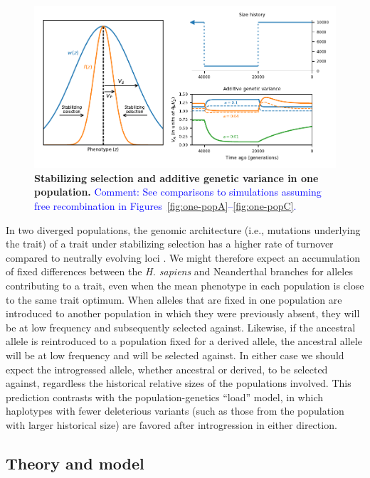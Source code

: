 \documentclass{article}
\newcommand{\aprcomment}[1]{{\textcolor{blue}{Comment: #1}}}
\begin{document}
\begin{figure}[tb!]
    \centering
    \includegraphics{../figures/one_pop.pdf}
    \caption{
        \textbf{Stabilizing selection and additive genetic variance in one population.}
        \aprcomment{See comparisons to simulations assuming free recombination in
        Figures~\ref{fig:one-popA}--\ref{fig:one-popC}.}
    }
    \label{fig:one-pop}
\end{figure}

In two diverged populations, the genomic architecture (i.e., mutations
underlying the trait) of a trait under stabilizing selection has a higher rate
of turnover compared to neutrally evolving loci \citep{yair2022population}. We
might therefore expect an accumulation of fixed differences between the
\emph{H. sapiens} and Neanderthal branches for alleles contributing to a trait,
even when the mean phenotype in each population is close to the same trait
optimum. When alleles that are fixed in one population are introduced to
another population in which they were previously absent, they will be at low
frequency and subsequently selected against. Likewise, if the ancestral allele
is reintroduced to a population fixed for a derived allele, the ancestral
allele will be at low frequency and will be selected against. In either case we
should expect the introgressed allele, whether ancestral or derived, to be
selected against, regardless the historical relative sizes of the populations
involved. This prediction contrasts with the population-genetics ``load''
model, in which haplotypes with fewer deleterious variants (such as those from
the population with larger historical size) are favored after introgression in
either direction.


\subsection*{Theory and model}
\end{document}
